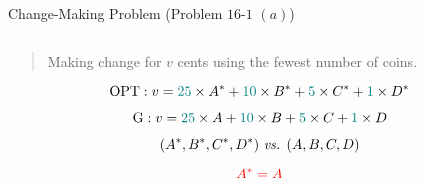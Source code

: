 
\begin{frame}{}
  \begin{exampleblock}{Change-Making Problem (Problem $16$-$1$ $(a)$)}
    \begin{columns}
    \end{columns}

    \vspace{0.30cm}
    \begin{quote}
      \centering
      {\large Making change for $v$ cents using the fewest number of coins.}
    \end{quote}
  \end{exampleblock}
\end{frame}

\begin{frame}{}
  \[
    \text{OPT}: v = \textcolor{teal}{25} \times A^{\ast} + \textcolor{teal}{10} \times B^{\ast} + \textcolor{teal}{5} \times C^{\ast} + \textcolor{teal}{1} \times D^{\ast}
  \]

  \pause
  \[
    \text{G}: v = \textcolor{teal}{25} \times A + \textcolor{teal}{10} \times B + \textcolor{teal}{5} \times C + \textcolor{teal}{1} \times D
  \]

  \pause
  \[
    (A^{\ast}, B^{\ast}, C^{\ast}, D^{\ast}) \text{ \it vs. } (A, B, C, D)
  \]

  \pause
  \vspace{0.30cm}
  \[
    \textcolor{red}{A^{\ast} = A}
  \]
\end{frame}

